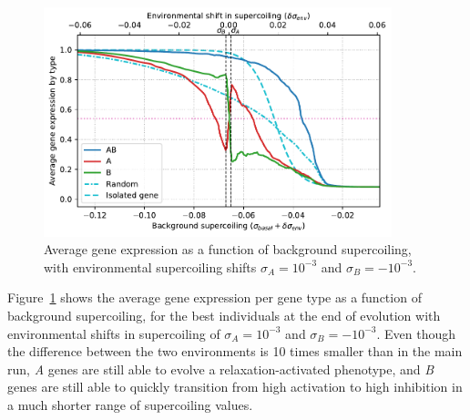\begin{figure}[H]
\centering
\includegraphics[width=0.9\textwidth]{param/sigma/sigma-1e-3/activity_sigmas_avg.pdf}
\caption[Average gene expression as a function of background supercoiling, with an absolute environmental supercoiling shift of 0.001]{Average gene expression as a function of background supercoiling, with environmental supercoiling shifts $\sigma_A = 10^{-3}$ and $\sigma_B = -10^{-3}$.}
\label{fig:param:sigma-1e-3-activ-by-sigma}
\end{figure}

Figure~\ref{fig:param:sigma-1e-3-activ-by-sigma} shows the average gene expression per gene type as a function of background supercoiling, for the best individuals at the end of evolution with environmental shifts in supercoiling of $\sigma_A = 10^{-3}$ and $\sigma_B = -10^{-3}$.
Even though the difference between the two environments is 10 times smaller than in the main run, \emph{A} genes are still able to evolve a relaxation-activated phenotype, and \emph{B} genes are still able to quickly transition from high activation to high inhibition in a much shorter range of supercoiling values.

